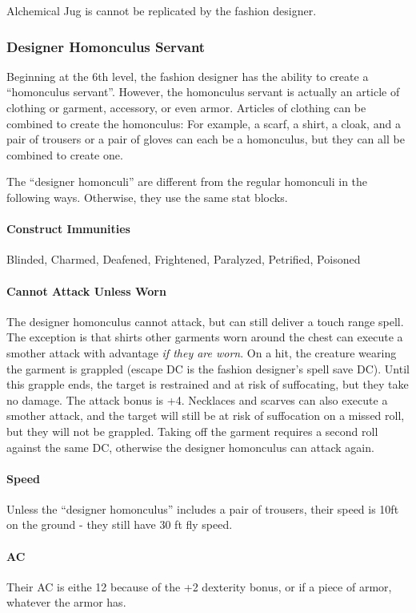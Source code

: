 \documentclass[twocolumn]{dndbook}
\begin{document}
Alchemical Jug is cannot be replicated by the fashion designer.

\subsubsection{Designer Homonculus Servant}
Beginning at the 6th level, the fashion designer has the ability to create a ``homonculus servant''.
However, the homonculus servant is actually an article of clothing or garment, accessory, or even armor.
Articles of clothing can be combined to create the homonculus:
For example, a scarf, a shirt, a cloak, and a pair of trousers or a pair of gloves can each be a homonculus,
but they can all be combined to create one.

The ``designer homonculi'' are different from the regular homonculi in the following ways.
Otherwise, they use the same stat blocks.

\paragraph{Construct Immunities} Blinded, Charmed, Deafened, Frightened, Paralyzed, Petrified, Poisoned

\paragraph{Cannot Attack Unless Worn}
The designer homonculus cannot attack, but can still deliver a touch range spell.
The exception is that shirts other garments worn around the chest can execute a smother attack with advantage \emph{if they are worn}.
On a hit, the creature wearing the garment is grappled (escape DC is the fashion designer's spell save DC).
Until this grapple ends, the target is restrained and at risk of suffocating, but they take no damage.
The attack bonus is +4.
Necklaces and scarves can also execute a smother attack, and the target will still be at risk of suffocation on a missed roll, but they will not be grappled.
Taking off the garment requires a second roll against the same DC, otherwise the designer homonculus can attack again.

\paragraph{Speed}
Unless the ``designer homonculus'' includes a pair of trousers, their speed is 10ft on the ground - they still have 30 ft fly speed.

\paragraph{AC}
Their AC is eithe 12 because of the +2 dexterity bonus, or if a piece of armor, whatever the armor has.
\end{document}
